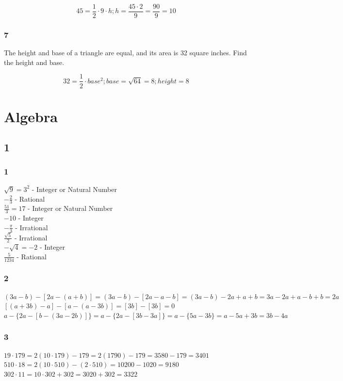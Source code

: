 \documentclass[]{report}
\begin{document}
\[
45 = \frac{1}{2} \cdot 9 \cdot h;
h = \frac{45\cdot2}{9} = \frac{90}{9} = 10
\]

\subsubsection{7}
The height and base of a triangle are equal, and its area is 32 square inches. Find the height and base.

\[
32 = \frac{1}{2}\cdot base^2;
base = \sqrt{64} = 8; height =8
\]

\section{Algebra}

\subsection{1}

\subsubsection{1}
$\sqrt{9} = 3^2$ - Integer or Natural Number\\
$-\frac{2}{3}$ - Rational \\
$ \frac{51}{3} = 17 $ - Integer or Natural Number \\
$ -10 $ - Integer \\
$ -\frac{\pi}{3} $ - Irrational \\
$ \frac{\sqrt{5}}{2} $ - Irrational \\
$ - \sqrt{4} = -2 $ - Integer \\
$ \frac{5}{1234} $ - Rational 

\subsubsection{2}
$ (3a - b)  - [2a - (a + b)] = (3a - b) - [2a - a - b] = (3a - b) - 2a + a + b = 3a - 2a + a - b + b = 2a $ \\


$ [(a + 3b) -a] - [a - (a - 3b)] =  [3b] -  [3b] = 0 $ \\



$ a - \{2a - [b - (3a - 2b)]\} = a  - \{2a - [3b - 3a]\} = a  - \{5a - 3b\} = a - 5a + 3b = 3b - 4a $

\subsubsection{3}
$ 19 \cdot 179 = 2(10 \cdot 179) - 179 = 2(1790) - 179 = 3580 - 179 = 3401 $ \\
$ 510 \cdot 18 = 2(10 \cdot 510) - (2 \cdot 510) = 10200 - 1020 = 9180 $ \\
$ 302 \cdot 11 = 10\cdot 302 + 302 = 3020 + 302 = 3322 $ \\
\end{document}
